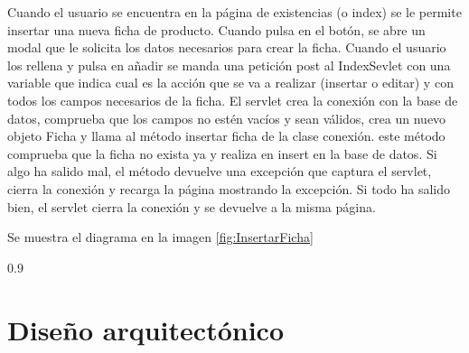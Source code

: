 Cuando el usuario se encuentra en la página de existencias (o index) se le permite insertar una nueva ficha de producto. Cuando pulsa en el botón, se abre un modal que le solicita los datos necesarios para crear la ficha. Cuando el usuario los rellena y pulsa en añadir se manda una petición post al IndexSevlet con una variable que indica cual es la acción que se va a realizar (insertar o editar) y con todos los campos necesarios de la ficha. El servlet crea la conexión con la base de datos, comprueba que los campos no estén vacíos y sean válidos, crea un nuevo objeto Ficha y llama al método insertar ficha de la clase conexión. este método comprueba que la ficha no exista ya y realiza en insert en la base de datos. Si algo ha salido mal, el método devuelve una excepción que captura el servlet, cierra la conexión y recarga la página mostrando la excepción. Si todo ha salido bien, el servlet  cierra la conexión y se devuelve a la misma página.

Se muestra el diagrama en la imagen \ref{fig:InsertarFicha}

 {0.9}

 
\section{Diseño arquitectónico}


